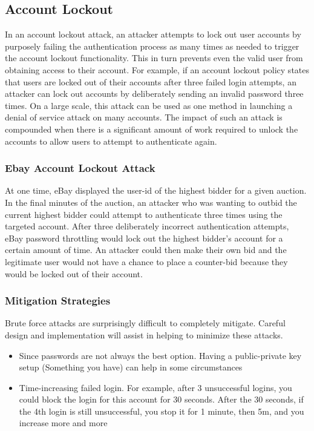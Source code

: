 \documentclass[a4paper, titlepage]{article}
\begin{document}
\subsection{Account Lockout}

In an account lockout attack, an attacker attempts to lock out user accounts by purposely failing the authentication process as many times as needed to trigger the account lockout functionality. This in turn prevents even the valid user from obtaining access to their account. For example, if an account lockout policy states that users are locked out of their accounts after three failed login attempts, an attacker can lock out accounts by deliberately sending an invalid password three times. On a large scale, this attack can be used as one method in launching a denial of service attack on many accounts. The impact of such an attack is compounded when there is a significant amount of work required to unlock the accounts to allow users to attempt to authenticate again.

\subsubsection{Ebay Account Lockout Attack}
At one time, eBay displayed the user-id of the highest bidder for a given auction. In the final minutes of the auction, an attacker who was wanting to outbid the current highest bidder could attempt to authenticate three times using the targeted account. After three deliberately incorrect authentication attempts, eBay password throttling would lock out the highest bidder's account for a certain amount of time. An attacker could then make their own bid and the legitimate user would not have a chance to place a counter-bid because they would be locked out of their account.

\subsubsection{Mitigation Strategies}
Brute force attacks are surprisingly difficult to completely mitigate. Careful design and implementation will assist in helping to minimize these attacks.
\begin{itemize}
    \item Since passwords are not always the best option. Having a public-private key setup (Something you have) can help in some circumstances
    \item Time-increasing failed login. For example, after 3 unsuccessful logins, you could block the login for this account for 30 seconds. After the 30 seconds, if the 4th login is still unsuccessful, you stop it for 1 minute, then 5m, and you increase more and more
\end{itemize}
\end{document}
